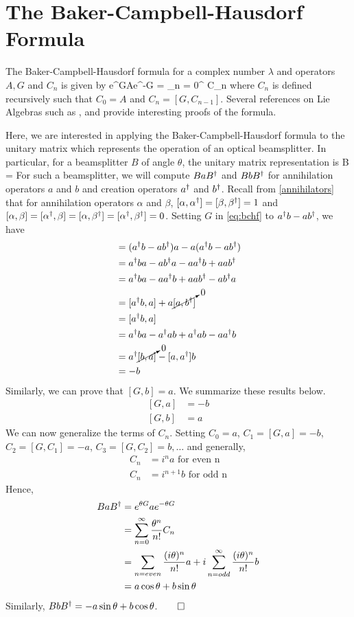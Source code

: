 \chapter{The Baker-Campbell-Hausdorf Formula\label{ch:bchf}}
The Baker-Campbell-Hausdorf formula for a complex number $\lambda$ and operators $A,G$ and $C_n$ is given by
\beq
\label{eq:bchf}
e^{\lambda G}Ae^{-\lambda G} = \sum\limits_{n = 0}^\infty {} C_n
\eeq
where $C_n$ is defined recursively such that $C_0 = A$ and $C_n = [G,C_{n-1}]$. Several references on Lie Algebras such as \cite{liealgs}, \cite{liealgs2} and \cite{liealgs3} provide interesting proofs of the formula.

Here, we are interested in applying the Baker-Campbell-Hausdorf formula to the unitary matrix which represents the operation of an optical beamsplitter. In particular, for a beamsplitter $B$ of angle $\theta$, the unitary matrix representation is
\beq
\label{eq:bseq}
B = 
\eeq
For such a beamsplitter, we will compute $BaB^\dagger$ and $BbB^\dagger$ for annihilation operators $a$ and $b$ and creation operators $a^\dagger$ and $b^\dagger$. Recall from \ref{annihilators} that for annihilation operators $\alpha$ and $\beta$, $[\alpha,\alpha^\dagger] = [\beta,\beta^\dagger] = 1$ and $[\alpha,\beta] = [\alpha^\dagger,\beta] = [\alpha,\beta^\dagger] = [\alpha^\dagger,\beta^\dagger] = 0$. 
Setting $G$ in \eqref{eq:bchf} to $a^\dagger b - ab^\dagger$, we have
\begin{align*}
[G,a] &= (\adj{a} b - a\adj{b})a - a(\adj{a} b - a\adj{b}) \\
&= \adj{a}ba - a\adj{b}a - a\adj{a}b + aa\adj{b}\\
&= \adj{a}ba - a\adj{a}b + aa\adj{b} - a\adj{b}a\\
&= [\adj{a}b,a] + a\cancelto{0}{[a,\adj{b}]}\\
&= [\adj{a}b,a]\\
&= \adj{a}ba - \adj{a}ab + \adj{a}ab - a\adj{a}b\\
&= \adj{a}\cancelto{0}{[b,a]} - [a,\adj{a}]b\\
&= -b
\end{align*}
Similarly, we can prove that $[G,b] = a$. We summarize these results below. 
\begin{align}
\label{eq:Gcommutes}
[G,a] &= -b\\
[G,b] &= a
\end{align}
We can now generalize the terms of $C_n$. Setting $C_0 = a$, $C_1 = [G,a] = -b$, $C_2 = [G,C_1] = -a$, $C_3 = [G,C_2] = b,\ldots$ and generally,
\begin{align*}
C_n &= i^na \text{ for even n}\\
C_n &= i^{n+1}b \text{ for odd n}
\end{align*}
Hence,
\begin{align}
BaB^\dagger &= e^{\theta G}ae^{-\theta G}\\
&= \sum\limits_{n=0}^\infty \frac{\theta^n}{n!}C_n\\
&= \sum\limits_{n = even} \frac{(i\theta)^n}{n!}a + i\sum\limits_{n = odd}^\infty \frac{(i\theta)^n}{n!}b\\
&= a\cos\theta + b\sin\theta
\end{align}
Similarly, $BbB^\dagger = -a\sin\theta + b\cos\theta$.$\qed$
